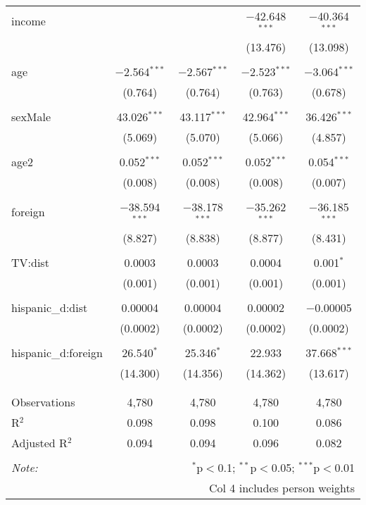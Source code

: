 \begin{table}[!htbp]
\begin{tabular}{@{\extracolsep{-5pt}}lcccc}
 income &  &  & $-$42.648$^{***}$ & $-$40.364$^{***}$ \\ 
  &  &  & (13.476) & (13.098) \\ 
  & & & & \\ 
 age & $-$2.564$^{***}$ & $-$2.567$^{***}$ & $-$2.523$^{***}$ & $-$3.064$^{***}$ \\ 
  & (0.764) & (0.764) & (0.763) & (0.678) \\ 
  & & & & \\ 
 sexMale & 43.026$^{***}$ & 43.117$^{***}$ & 42.964$^{***}$ & 36.426$^{***}$ \\ 
  & (5.069) & (5.070) & (5.066) & (4.857) \\ 
  & & & & \\ 
 age2 & 0.052$^{***}$ & 0.052$^{***}$ & 0.052$^{***}$ & 0.054$^{***}$ \\ 
  & (0.008) & (0.008) & (0.008) & (0.007) \\ 
  & & & & \\ 
 foreign & $-$38.594$^{***}$ & $-$38.178$^{***}$ & $-$35.262$^{***}$ & $-$36.185$^{***}$ \\ 
  & (8.827) & (8.838) & (8.877) & (8.431) \\ 
  & & & & \\ 
 TV:dist & 0.0003 & 0.0003 & 0.0004 & 0.001$^{*}$ \\ 
  & (0.001) & (0.001) & (0.001) & (0.001) \\ 
  & & & & \\ 
 hispanic\_d:dist & 0.00004 & 0.00004 & 0.00002 & $-$0.00005 \\ 
  & (0.0002) & (0.0002) & (0.0002) & (0.0002) \\ 
  & & & & \\ 
 hispanic\_d:foreign & 26.540$^{*}$ & 25.346$^{*}$ & 22.933 & 37.668$^{***}$ \\ 
  & (14.300) & (14.356) & (14.362) & (13.617) \\ 
  & & & & \\ 
\hline \\[-1.8ex] 
Observations & 4,780 & 4,780 & 4,780 & 4,780 \\ 
R$^{2}$ & 0.098 & 0.098 & 0.100 & 0.086 \\ 
Adjusted R$^{2}$ & 0.094 & 0.094 & 0.096 & 0.082 \\ 
\hline 
\hline \\[-1.8ex] 
\textit{Note:}  & \multicolumn{4}{r}{$^{*}$p$<$0.1; $^{**}$p$<$0.05; $^{***}$p$<$0.01} \\ 
 & \multicolumn{4}{r}{Col 4 includes person weights} \\ 
\end{tabular} 
\end{table} 
